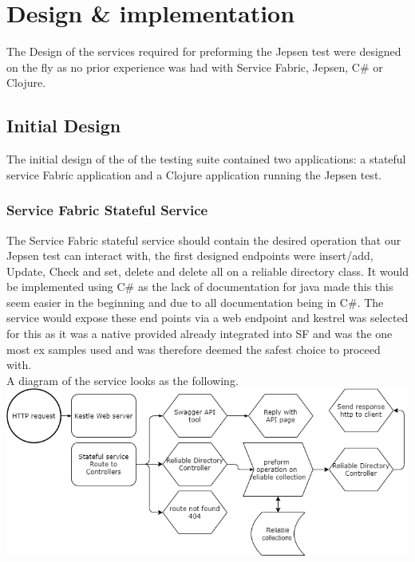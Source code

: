 \documentclass[a4paper,10pt,titlepage]{report}
\begin{document}
    \section{Design \& implementation}
    The Design of the services required for preforming the Jepsen test were designed on the fly as no prior experience was had with Service Fabric, Jepsen, C\# or Clojure.

    \subsection{Initial Design}

    The initial design of the of the testing suite contained two applications: a stateful service Fabric application and a Clojure application running the Jepsen test.

    \subsubsection{Service Fabric Stateful Service}

    The Service Fabric stateful service should contain the desired operation that our Jepsen test can interact with, the first designed endpoints were insert/add, Update, Check and set, delete and delete all on a reliable directory class. It would be implemented using C\# as the lack of documentation for java made this this seem easier in the beginning and due to all documentation being in C\#. The service would expose these end points via a web endpoint and kestrel was selected for this as it was a native provided already integrated into SF and was the one most ex samples used and was therefore deemed the safest choice to proceed with.\\
    \vspace{5mm}
    A diagram of the service looks as the following. \\
    \vspace{5mm}
    \includegraphics[scale=0.5]{images/Design_Stateful_service_1.0.drawio.png}
\end{document}
